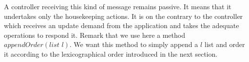 \documentclass{article}
\theoremstyle{remark}
\begin{document}
A controller receiving this kind of message remains passive. It means that it undertakes only the housekeeping actions. It is on the contrary to the controller which receives an update demand from the application and takes the adequate operations to respond it.
Remark that we use here a method $appendOrder(\textit{list } l)$. We want this method to simply append a $l$ list and order it according to the lexicographical order introduced in the next section.
%

%
\end{document}
